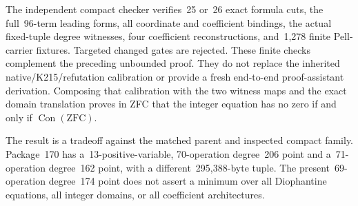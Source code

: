 The independent compact checker verifies~25 or~26 exact formula cuts,
the full~96-term leading forms, all coordinate and coefficient bindings,
the actual fixed-tuple degree witnesses, four coefficient reconstructions,
and~1,278 finite Pell-carrier fixtures.  Targeted changed gates are rejected.
These finite checks complement the preceding unbounded proof.  They do
not replace the inherited native/K215/refutation calibration or provide a
fresh end-to-end proof-assistant derivation.  Composing that calibration
with the two witness maps and the exact domain translation proves in ZFC
that the integer equation has no zero if and only if
$\operatorname{Con}(\mathrm{ZFC})$.

The result is a tradeoff against the matched parent and inspected compact
family.  Package~170 has a~13-positive-variable, 70-operation degree~206
point and a~71-operation degree~162 point, with a different~295,388-byte
tuple.  The present~69-operation degree~174 point does not assert a
minimum over all Diophantine equations, all integer domains, or all
coefficient architectures.
